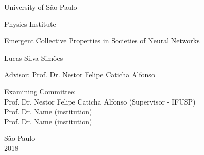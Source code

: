 
\pagestyle{empty}

\begin{center}
{\fontsize{16}{16} \selectfont University of São Paulo \\}

\vspace{0.1cm}

{\fontsize{16}{16} \selectfont Physics Institute}

\vspace{3.3cm}

{\fontsize{22}{22}\selectfont Emergent Collective Properties in Societies of Neural Networks \par}

\vspace{2cm}

{\fontsize{18}{18}\selectfont Lucas Silva Simões \par}

\vspace{2cm}

\end{center}

\leftskip 4cm

\begin{flushright}
\leftskip 4cm
Advisor: Prof. Dr. Nestor Felipe Caticha Alfonso
\end{flushright}

\vspace{0.5cm}

\par
\leftskip 4cm

\par

\leftskip 0cm

\vskip 1.5cm

\noindent Examining Committee: \\
\noindent Prof. Dr. Nestor Felipe Caticha Alfonso (Supervisor - IFUSP)\\
Prof. Dr. Name (institution)\\
Prof. Dr. Name (institution)\\
\vspace{1.cm}

\begin{center}
	São Paulo \\ 2018
\end{center}

